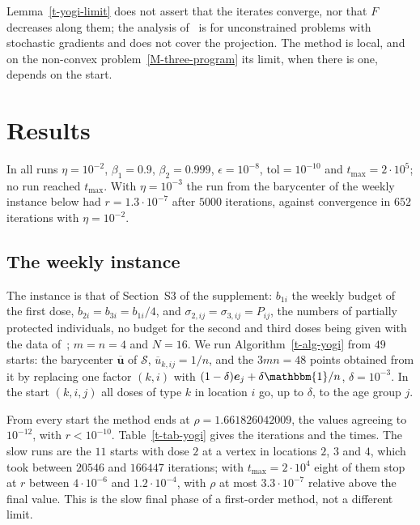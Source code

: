 \documentclass[11pt]{article}
\theoremstyle{plain}
\theoremstyle{remark}
\numberwithin{equation}{section}
\begin{document}
Lemma~\ref{t-yogi-limit} does not assert that the iterates converge, nor
that $F$ decreases along them; the analysis of~\cite{2018Zaheer_Yogi} is for
unconstrained problems with stochastic gradients and does not cover the
projection. The method is local, and on the non-convex
problem~\eqref{M-three-program} its limit, when there is one, depends on the
start.

\section{Results}\label{t-results}

In all runs $\eta=10^{-2}$, $\beta_1=0.9$, $\beta_2=0.999$,
$\epsilon=10^{-8}$, $\mathrm{tol}=10^{-10}$ and $t_{\max}=2\cdot 10^5$; no run
reached $t_{\max}$. With $\eta=10^{-3}$ the run from the barycenter of the
weekly instance below had $r=1.3\cdot 10^{-7}$ after $5000$ iterations,
against convergence in $652$ iterations with $\eta=10^{-2}$.

\subsection{The weekly instance}

The instance is that of Section~S3 of the supplement: $b_{1i}$ the weekly
budget of the first dose, $b_{2i}=b_{3i}=b_{1i}/4$, and
$\sigma_{2,ij}=\sigma_{3,ij}=P_{ij}$, the numbers of partially protected
individuals, no budget for the second and third doses being given with the
data of~\cite{JZh}; $m=n=4$ and $N=16$. We run Algorithm~\ref{t-alg-yogi} from
$49$ starts: the barycenter $\overline{\bm u}$ of $\mathcal{S}$,
$\overline u_{k,ij}=1/n$, and the $3mn=48$ points obtained from it by
replacing one factor $(k,i)$ with $(1-\delta)\bm e_j+\delta\mathbbm{1}/n$,
$\delta=10^{-3}$. In the start $(k,i,j)$ all doses of type $k$ in location $i$
go, up to $\delta$, to the age group $j$.

From every start the method ends at $\rho=1.661826042009$, the values agreeing
to $10^{-12}$, with $r<10^{-10}$. Table~\ref{t-tab-yogi} gives the iterations
and the times. The slow runs are the $11$ starts with dose $2$ at a vertex in
locations $2$, $3$ and $4$, which took between $20546$ and $166447$
iterations; with $t_{\max}=2\cdot 10^4$ eight of them stop at $r$ between
$4\cdot 10^{-6}$ and $1.2\cdot 10^{-4}$, with $\rho$ at most
$3.3\cdot 10^{-7}$ relative above the final value. This is the slow final
phase of a first-order method, not a different limit.
\end{document}
